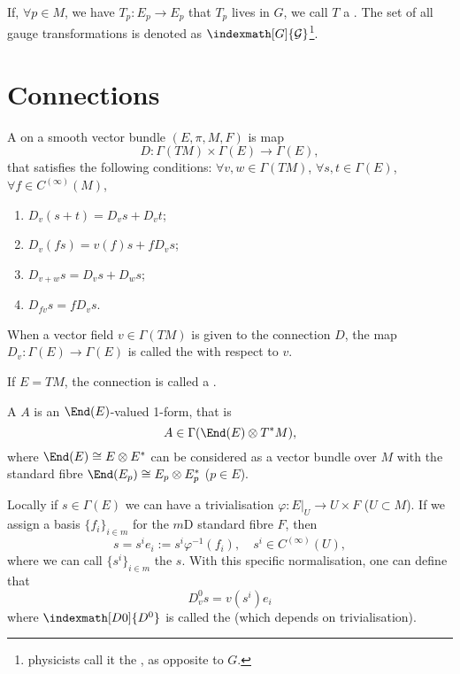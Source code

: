 \documentclass[openany, oneside, a5paper]{book}
\begin{document}
If, $\forall p \in M$, we have $T_p \colon E_p \to E_p$ that $T_p$ lives in $G$, we call $T$ a .
The set of all gauge transformations is denoted as $\indexmath[G]{\mathcal G}$\footnote{physicists call it the , as opposite to $G$.}.

\section{Connections}

\begin{definition}[Connection]
    A  on a smooth vector bundle $(E, \pi, M, F)$ is map
    \begin{equation}
        D \colon \Gamma(TM) \times \Gamma(E) \to \Gamma(E),
    \end{equation}
    that satisfies the following conditions:
    $\forall v, w \in \Gamma(TM)$, $\forall s, t \in \Gamma(E)$, $\forall f \in C^{(\infty)}(M)$,
    \begin{enumerate}[label=(\alph*)]
        \item $D_v (s + t) = D_v s + D_v t$;
        \item $D_v (fs) = v(f) s +  f D_v s$;
        \item $D_{v + w} s = D_v s + D_w s$;
        \item $D_{fv} s = f D_v s$.
    \end{enumerate}
\end{definition}

When a vector field $v \in \Gamma(TM)$ is given to the connection $D$, the map $D_v \colon \Gamma(E) \to \Gamma(E)$ is called the  with respect to $v$.

If $E = TM$, the connection is called a .

\begin{definition}
    A  $A$ is an $\End(E)$-valued 1-form, that is
    \begin{equation}
        A \in \Gamma(\End(E) \otimes T^*M),
    \end{equation}
    where $\End(E) \cong E \otimes E^*$ can be considered as a vector bundle over $M$ with the standard fibre $\End(E_p) \cong E_p \otimes E_p^*$ ($p \in E$).
\end{definition}

Locally if $s \in \Gamma(E)$ we can have a trivialisation $\varphi \colon E|_U \to U \times F$ ($U \subset M$).
If we assign a basis $\{f_i\}_{i \in m}$ for the $m$D standard fibre $F$, then 
\begin{equation}
    s = s^i e_i := s^i\varphi^{-1}(f_i),
    \quad s^i \in C^{(\infty)}(U),
\end{equation} 
where we can call $\{s^i\}_{i \in m}$ the  $s$.
With this specific normalisation, one can define that
\begin{equation}
    D^0_v s = v(s^i) e_i
\end{equation}
where $\indexmath[D0]{D^0}$ is called the  (which depends on trivialisation).
\end{document}
